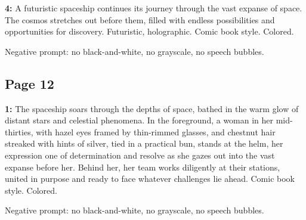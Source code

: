 \begin{iquote}
    \textbf{4:} A futuristic spaceship continues its journey through the vast expanse of space. The cosmos stretches out before them, filled with endless possibilities and opportunities for discovery. Futuristic, holographic. Comic book style. Colored.

    \noindent Negative prompt: no black-and-white, no grayscale, no speech bubbles.
\end{iquote}


\subsection*{Page 12}
\begin{iquote}
    \textbf{1:} The spaceship soars through the depths of space, bathed in the warm glow of distant stars and celestial phenomena. In the foreground, a woman in her mid-thirties, with hazel eyes framed by thin-rimmed glasses, and chestnut hair streaked with hints of silver, tied in a practical bun, stands at the helm, her expression one of determination and resolve as she gazes out into the vast expanse before her. Behind her, her team works diligently at their stations, united in purpose and ready to face whatever challenges lie ahead. Comic book style. Colored.

    \noindent Negative prompt: no black-and-white, no grayscale, no speech bubbles.
\end{iquote}
